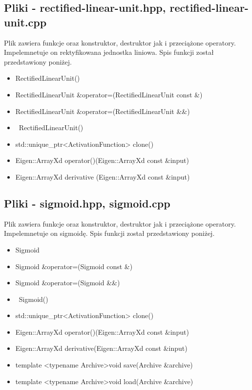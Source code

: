 \documentclass{classrep}
\begin{document}
{        \subsection{Pliki - rectified-linear-unit.hpp, rectified-linear-unit.cpp}
        {
            Plik zawiera funkcje oraz konstruktor, destruktor jak i przeciążone operatory.
            Impelemnetuje on rektyfikowana jednostka liniowa.
            Spis funkcji został przedstawiony poniżej.
            \begin{itemize}
                \item RectifiedLinearUnit()
                \item RectifiedLinearUnit \&operator=(RectifiedLinearUnit const \&)
                \item RectifiedLinearUnit \&operator=(RectifiedLinearUnit \&\&)
                \item ~RectifiedLinearUnit()
                \item std::unique\_ptr<ActivationFunction> clone()
                \item Eigen::ArrayXd operator()(Eigen::ArrayXd const \&input)
                \item Eigen::ArrayXd derivative (Eigen::ArrayXd const \&input)
            \end{itemize}
        }

        \subsection{Pliki - sigmoid.hpp, sigmoid.cpp}
        {
            Plik zawiera funkcje oraz konstruktor, destruktor jak i przeciążone operatory.
            Impelemnetuje on sigmoidę.
            Spis funkcji został przedstawiony poniżej.
            \begin{itemize}
                \item Sigmoid
                \item Sigmoid \&operator=(Sigmoid const \&)
                \item Sigmoid \&operator=(Sigmoid \&\&)
                \item ~Sigmoid()
                \item std::unique\_ptr<ActivationFunction> clone()
                \item Eigen::ArrayXd operator()(Eigen::ArrayXd const \&input)
                \item Eigen::ArrayXd derivative(Eigen::ArrayXd const \&input)
                \item  template <typename Archive>void save(Archive \&archive)
                \item template <typename Archive>void load(Archive \&archive)
            \end{itemize}
        }

}
\end{document}
